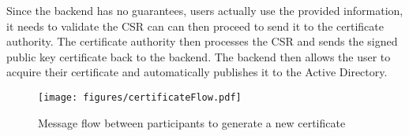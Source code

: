 Since the backend has no guarantees, users actually use the provided information, it needs to validate the CSR can can
then proceed to send it to the certificate authority.
The certificate authority then processes the CSR and sends the signed public key certificate back to the backend.
The backend then allows the user to acquire their certificate and automatically publishes it to the Active Directory.

\begin{figure}[hb]
    \centering
    \texttt{[image: figures/certificateFlow.pdf]}
    \caption{Message flow between participants to generate a new certificate}
    \label{fig:certificateFlow}
\end{figure}
